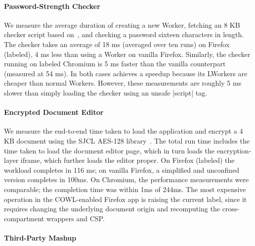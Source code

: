 \paragraph{Password-Strength Checker}
%
%
We measure the average duration of creating a new Worker, fetching an
8 KB checker script based on~\cite{checker1}, and checking a password
sixteen characters in length.
%
The checker takes an average of 18 ms (averaged over ten runs) on
Firefox (labeled), 4 ms less than using a Worker on vanilla Firefox.
%
Similarly, the checker running on labeled Chromium is 5 ms faster than
the vanilla counterpart (measured at 54 ms).
%
In both cases \sys{} achieves a speedup because its LWorkers are
cheaper than normal Workers.
%
However, these measurements are roughly 5 ms slower than simply loading
the checker using an unsafe \js|script| tag.

\paragraph{Encrypted Document Editor}

%
We measure the end-to-end time taken to load the application and
encrypt a 4 KB document using the SJCL AES-128 library~\cite{sjcl}.
%
The total run time includes the time taken to load the document editor
page, which in turn loads the encryption-layer iframe, which further
loads the editor proper.
%
On Firefox (labeled) the workload completes in 116 ms;  on vanilla
Firefox, a simplified and unconfined version completes in 100ms.
%
On Chromium, the performance measurements were comparable; the
completion time was within 1ms of 244ms.
%
The most expensive operation in the COWL-enabled Firefox app is
raising the current label, since it requires changing the underlying
document origin and recomputing the cross-compartment wrappers and CSP.


\paragraph{Third-Party Mashup}

